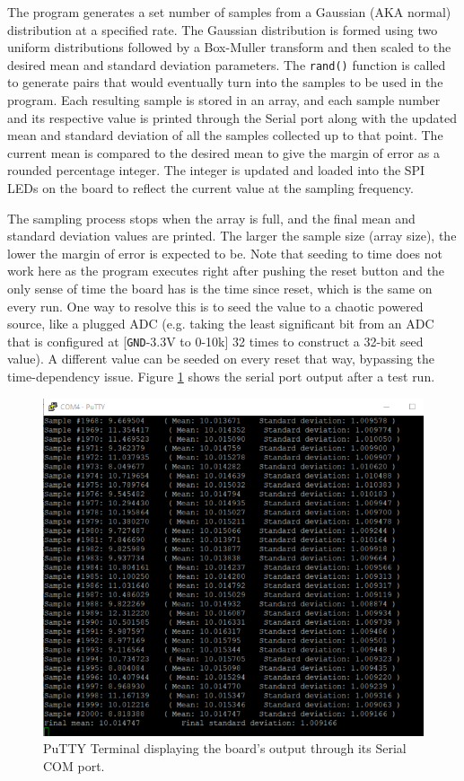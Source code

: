 \documentclass{article}
\begin{document}
The program generates a set number of samples from a Gaussian (AKA normal) distribution at a specified rate. The Gaussian distribution is formed using two uniform distributions followed by a Box-Muller transform and then scaled to the desired mean and standard deviation parameters. The \texttt{rand()} function is called to generate pairs that would eventually turn into the samples to be used in the program. Each resulting sample is stored in an array, and each sample number and its respective value is printed through the Serial port along with the updated mean and standard deviation of all the samples collected up to that point. The current mean is compared to the desired mean to give the margin of error as a rounded percentage integer. The integer is updated and loaded into the SPI LEDs on the board to reflect the current value at the sampling frequency.\pagebreak

The sampling process stops when the array is full, and the final mean and standard deviation values are printed. The larger the sample size (array size), the lower the margin of error is expected to be. Note that seeding to time does not work here as the program executes right after pushing the reset button and the only sense of time the board has is the time since reset, which is the same on every run. One way to resolve this is to seed the value to a chaotic powered source, like a plugged ADC (e.g. taking the least significant bit from an ADC that is configured at [\texttt{GND}-3.3V to 0-10k] 32 times to construct a 32-bit seed value). A different value can be seeded on every reset that way, bypassing the time-dependency issue. Figure \ref{fig:q2} shows the serial port output after a test run.

\begin{figure}[!ht]
\begin{center}
\includegraphics[scale=1.22]{Figures/Q2run.png}
\end{center}
\caption {PuTTY Terminal displaying the board's output through its Serial COM port.}
\label{fig:q2}
\end{figure}
\end{document}
